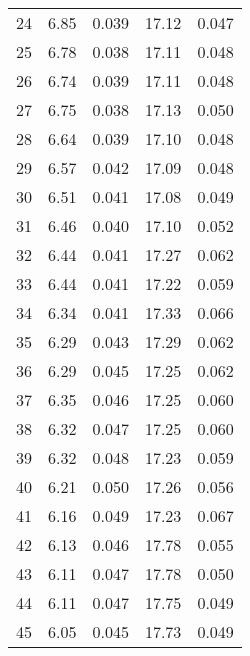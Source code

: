 \begin{table}
\begin{tabular}{c|ll|ll}
24 & 6.85 & 0.039 & 17.12 & 0.047 \\
25 & 6.78 & 0.038 & 17.11 & 0.048 \\
26 & 6.74 & 0.039 & 17.11 & 0.048 \\
27 & 6.75 & 0.038 & 17.13 & 0.050 \\
28 & 6.64 & 0.039 & 17.10 & 0.048 \\
29 & 6.57 & 0.042 & 17.09 & 0.048 \\
30 & 6.51 & 0.041 & 17.08 & 0.049 \\
31 & 6.46 & 0.040 & 17.10 & 0.052 \\
32 & 6.44 & 0.041 & 17.27 & 0.062 \\
33 & 6.44 & 0.041 & 17.22 & 0.059 \\
34 & 6.34 & 0.041 & 17.33 & 0.066 \\
35 & 6.29 & 0.043 & 17.29 & 0.062 \\
36 & 6.29 & 0.045 & 17.25 & 0.062 \\
37 & 6.35 & 0.046 & 17.25 & 0.060 \\
38 & 6.32 & 0.047 & 17.25 & 0.060 \\
39 & 6.32 & 0.048 & 17.23 & 0.059 \\
40 & 6.21 & 0.050 & 17.26 & 0.056 \\
41 & 6.16 & 0.049 & 17.23 & 0.067 \\
42 & 6.13 & 0.046 & 17.78 & 0.055 \\
43 & 6.11 & 0.047 & 17.78 & 0.050 \\
44 & 6.11 & 0.047 & 17.75 & 0.049 \\
45 & 6.05 & 0.045 & 17.73 & 0.049 \\
               \hline
        \end{tabular}
    \end{table}
    \clearpage

